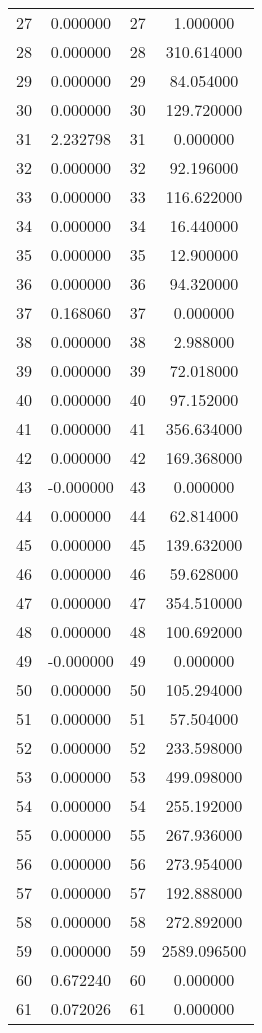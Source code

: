 \documentclass[12pt]{article}
\begin{document}
\begin{longtable}{@{}cccc@{}}
27 & 0.000000 & 27 & 1.000000 \\
28 & 0.000000 & 28 & 310.614000 \\
29 & 0.000000 & 29 & 84.054000 \\
30 & 0.000000 & 30 & 129.720000 \\
31 & 2.232798 & 31 & 0.000000 \\
32 & 0.000000 & 32 & 92.196000 \\
33 & 0.000000 & 33 & 116.622000 \\
34 & 0.000000 & 34 & 16.440000 \\
35 & 0.000000 & 35 & 12.900000 \\
36 & 0.000000 & 36 & 94.320000 \\
37 & 0.168060 & 37 & 0.000000 \\
38 & 0.000000 & 38 & 2.988000 \\
39 & 0.000000 & 39 & 72.018000 \\
40 & 0.000000 & 40 & 97.152000 \\
41 & 0.000000 & 41 & 356.634000 \\
42 & 0.000000 & 42 & 169.368000 \\
43 & -0.000000 & 43 & 0.000000 \\
44 & 0.000000 & 44 & 62.814000 \\
45 & 0.000000 & 45 & 139.632000 \\
46 & 0.000000 & 46 & 59.628000 \\
47 & 0.000000 & 47 & 354.510000 \\
48 & 0.000000 & 48 & 100.692000 \\
49 & -0.000000 & 49 & 0.000000 \\
50 & 0.000000 & 50 & 105.294000 \\
51 & 0.000000 & 51 & 57.504000 \\
52 & 0.000000 & 52 & 233.598000 \\
53 & 0.000000 & 53 & 499.098000 \\
54 & 0.000000 & 54 & 255.192000 \\
55 & 0.000000 & 55 & 267.936000 \\
56 & 0.000000 & 56 & 273.954000 \\
57 & 0.000000 & 57 & 192.888000 \\
58 & 0.000000 & 58 & 272.892000 \\
59 & 0.000000 & 59 & 2589.096500 \\
60 & 0.672240 & 60 & 0.000000 \\
61 & 0.072026 & 61 & 0.000000 \\

\end{longtable}
\end{document}
